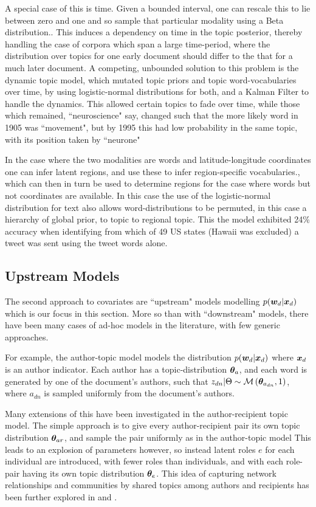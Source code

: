 A special case of this is time. Given a bounded interval, one can rescale this to lie between zero and one and so sample that particular modality using a Beta distribution.\cite{Wang2006}. This induces a dependency on time in the topic posterior, thereby handling the case of corpora which span a large time-period, where the distribution over topics for one early document should differ to the that for a much later document. A competing, unbounded solution to this problem is the dynamic topic model\cite{Blei2006a}, which mutated topic priors and topic word-vocabularies over time, by using logistic-normal distributions for both, and a Kalman Filter to handle the dynamics. This allowed certain topics to fade over time, while those which remained, ``neuroscience" say, changed such that the more likely word in 1905 was ``movement", but by 1995 this had low probability in the same topic, with its position taken by ``neurone"

In the case where the two modalities are words and latitude-longitude coordinates one can infer latent regions, and use these to infer region-specific vocabularies\cite{Eisenstein2010}., which can then in turn be used to determine regions for the case where words but not coordinates are available. In this case the use of the logistic-normal distribution for text also allows word-distributions to be permuted, in this case a hierarchy of global prior, to topic to regional topic. This the model exhibited 24\% accuracy when identifying from which of 49 US states (Hawaii was excluded) a tweet was sent using the tweet words alone.

\subsection{Upstream Models}
The second approach to covariates are ``upstream" models modelling $p({ \bm w_d } | { \bm x_d })$ which is our focus in this section. More so than with ``downstream" models, there have been many cases of ad-hoc models in the literature, with few generic approaches.

For example, the author-topic model\cite{RosenZvi2004} models the distribution $p({ \bm w_d } | { \bm x_d })$ where ${ \bm x_d }$ is an author indicator. Each author has a topic-distribution $\bm \theta_a$, and each word is generated by one of the document's authors, such that $z_{dn} | \Theta \sim \mathcal{M} \left( {\bm \theta_{a_{dn}}},{1} \right)$, where $a_{dn}$ is sampled uniformly from the document's authors.

Many extensions of this have been investigated in the author-recipient topic model\cite{MacCallum2007}. The simple approach is to give every author-recipient pair its own topic distribution $\bm \theta_{ar}$, and sample the pair uniformly as in the author-topic model This leads to an explosion of parameters however, so instead latent roles $e$ for each individual are introduced, with fewer roles than individuals, and with each role-pair having its own topic distribution $\bm \theta_e$. This idea of capturing network relationships and communities by shared topics among authors and recipients has been further explored in \cite{Sachan2012} and \cite{Kang2013}.


